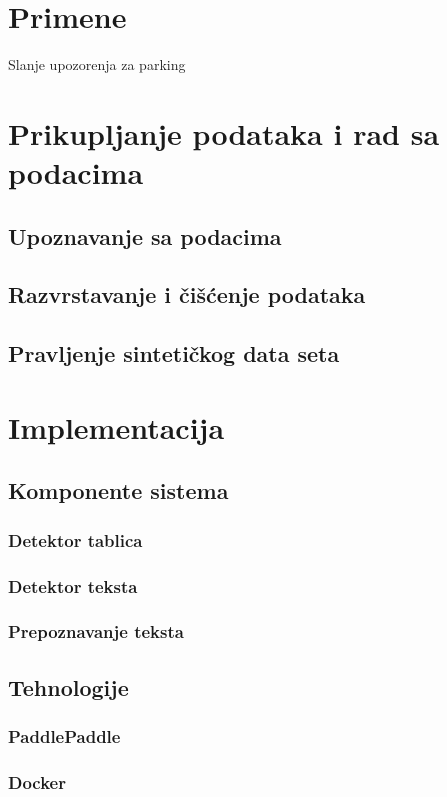 \documentclass[a4paper,12pt]{article}
\begin{document}
	\newpage
	
	\section{Primene}
	Slanje upozorenja za parking
	\newpage
	
	\section{Prikupljanje podataka i rad sa podacima}
	\subsection{Upoznavanje sa podacima}
	\subsection{Razvrstavanje i čišćenje podataka}
	\subsection{Pravljenje sintetičkog data seta}
	\newpage
	
	\section{Implementacija}
	\subsection{Komponente sistema}
	\subsubsection{Detektor tablica}
	\subsubsection{Detektor teksta}
	\subsubsection{Prepoznavanje teksta}
	\subsection{Tehnologije}
	\subsubsection{PaddlePaddle}
	\subsubsection{Docker}
\end{document}
